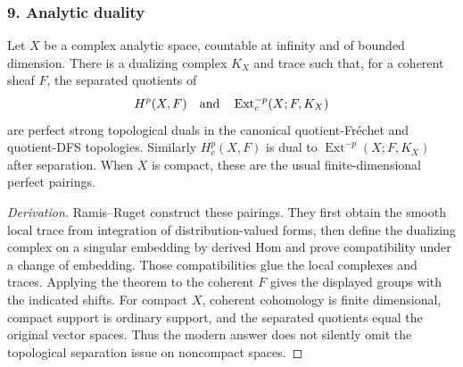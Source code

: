 \subsubsection{9. Analytic duality}
\begin{theorem}\label{B:subject9}
Let $X$ be a complex analytic space, countable at infinity and of bounded dimension. There is a dualizing complex $K_X$ and trace such that, for a coherent sheaf $F$, the separated quotients of
\[
 H^p(X,F)\quad\hbox{and}\quad\operatorname{Ext}^{-p}_c(X;F,K_X)
\]
are perfect strong topological duals in the canonical quotient-Fr\'echet and quotient-DFS topologies. Similarly $H_c^p(X,F)$ is dual to $\operatorname{Ext}^{-p}(X;F,K_X)$ after separation. When $X$ is compact, these are the usual finite-dimensional perfect pairings.
\end{theorem}
\begin{proof}[Derivation]
Ramis--Ruget \cite[Theorem 1, \S3, p.~81; Theorem 2, \S4]{BRamisRuget1970} construct these pairings. They first obtain the smooth local trace from integration of distribution-valued forms, then define the dualizing complex on a singular embedding by derived Hom and prove compatibility under a change of embedding. Those compatibilities glue the local complexes and traces. Applying the theorem to the coherent $F$ gives the displayed groups with the indicated shifts. For compact $X$, coherent cohomology is finite dimensional, compact support is ordinary support, and the separated quotients equal the original vector spaces. Thus the modern answer does not silently omit the topological separation issue on noncompact spaces.
\end{proof}

